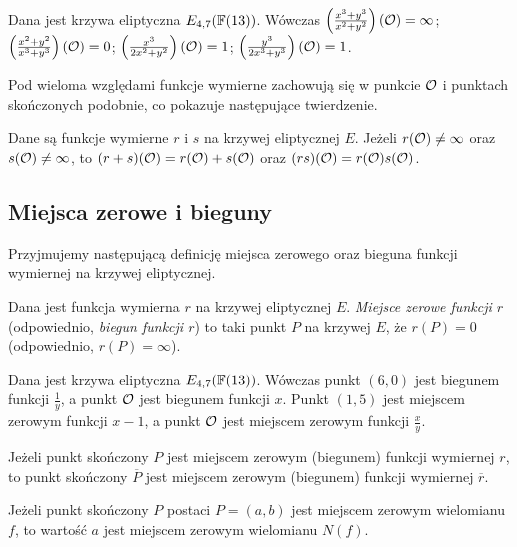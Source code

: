 \begin{example}
Dana jest krzywa eliptyczna $E_{4,7}(\mathbb{F}(13))$.
Wówczas $\left(\frac{x^3 + y^3}{x^2 + y^2}\right)(\mathcal{O}) = \infty$;
$\left(\frac{x^2 + y^2}{x^3 + y^3}\right)(\mathcal{O}) = 0$;
$\left(\frac{x^3}{2x^2 + y^2}\right)(\mathcal{O}) = 1$;
$\left(\frac{y^3}{2x^3 + y^3}\right)(\mathcal{O}) = 1$.
\end{example}

\noindent
Pod wieloma względami funkcje wymierne zachowują się
w punkcie $\mathcal{O}$ i punktach skończonych podobnie,
co pokazuje następujące twierdzenie.

\begin{theorem}
Dane są funkcje wymierne $r$ i $s$ na krzywej eliptycznej $E$.
Jeżeli $r(\mathcal{O}) \neq \infty$ oraz $s(\mathcal{O}) \neq \infty$,
to $(r + s)(\mathcal{O}) = r(\mathcal{O}) + s(\mathcal{O})$
oraz $(rs)(\mathcal{O}) = r(\mathcal{O})s(\mathcal{O})$.
\end{theorem}

\subsection*{Miejsca zerowe i bieguny}

\noindent
Przyjmujemy następującą definicję
miejsca zerowego oraz bieguna funkcji wymiernej na krzywej eliptycznej.

\begin{definition}
Dana jest funkcja wymierna $r$ na krzywej eliptycznej $E$.
\emph{Miejsce zerowe funkcji $r$} (odpowiednio, \emph{biegun funkcji $r$})
to taki punkt $P$ na krzywej $E$, że $r(P) = 0$ (odpowiednio, $r(P) = \infty$).
\end{definition}

\begin{example}
Dana jest krzywa eliptyczna $E_{4,7}(\mathbb{F}(13))$.
Wówczas punkt $(6, 0)$ jest biegunem funkcji $\frac{1}{y}$,
a punkt $\mathcal{O}$ jest biegunem funkcji $x$.
Punkt $(1, 5)$ jest miejscem zerowym funkcji $x-1$,
a punkt $\mathcal{O}$ jest miejscem zerowym funkcji $\frac{x}{y}$.
\end{example}

\begin{fact}
Jeżeli punkt skończony $P$
jest miejscem zerowym (biegunem) funkcji wymiernej $r$,
to punkt skończony $\overline{P}$
jest miejscem zerowym (biegunem) funkcji wymiernej $\overline{r}$.
\end{fact}

\begin{corollary}\label{zero_of_norm_coro}
Jeżeli punkt skończony $P$ postaci $P = (a, b)$
jest miejscem zerowym wielomianu $f$,
to wartość $a$ jest miejscem zerowym wielomianu $N(f)$.
\end{corollary}

